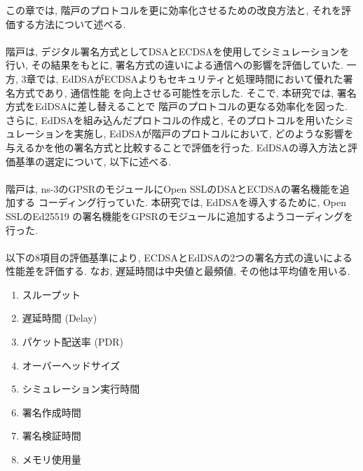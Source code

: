 \indent この章では, 階戸のプロトコルを更に効率化させるための改良方法と, 
それを評価する方法について述べる. \\

\\[0.5em]
\indent 階戸は, デジタル署名方式としてDSAとECDSAを使用してシミュレーションを行い, 
その結果をもとに, 署名方式の違いによる通信への影響を評価していた. 
一方, 3章では, EdDSAがECDSAよりもセキュリティと処理時間において優れた署名方式であり, 通信性能
を向上させる可能性を示した. そこで, 本研究では, 署名方式をEdDSAに差し替えることで
階戸のプロトコルの更なる効率化を図った. さらに, EdDSAを組み込んだプロトコルの作成と, 
そのプロトコルを用いたシミュレーションを実施し, EdDSAが階戸のプロトコルにおいて, 
どのような影響を与えるかを他の署名方式と比較することで評価を行った. 
EdDSAの導入方法と評価基準の選定について, 以下に述べる.\\[0.5em]
\\
\indent 階戸は, ns-3のGPSRのモジュールにOpen SSLのDSAとECDSAの署名機能を追加する
コーディング行っていた. 本研究では, EdDSAを導入するために, Open SSLのEd25519
\cite{openssl-eddsa}の署名機能をGPSRのモジュールに追加するようコーディングを行った. \\[0.5em]
\\
\indent 以下の8項目の評価基準により, ECDSAとEdDSAの2つの署名方式の違いによる
性能差を評価する. なお, 遅延時間は中央値と最頻値, その他は平均値を用いる. 
\vspace{-3mm}
\setlength{\columnsep}{10pt} %
\begin{multicols}{2}
  \begin{enumerate}
      \item スループット
      \item 遅延時間 (Delay) 
      \item パケット配送率 (PDR)
      \item オーバーヘッドサイズ\\
      \item シミュレーション実行時間
      \item 署名作成時間
      \item 署名検証時間
      \item メモリ使用量
  \end{enumerate}
\end{multicols}